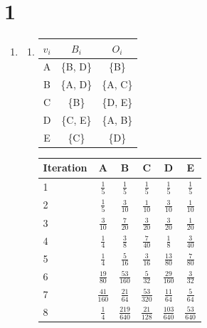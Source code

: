 \documentclass[ngerman]{scrartcl}
\begin{document}
\section*{1}
  \begin{enumerate}[label=\alph*)]
    \item
    \begin{enumerate}[label=\Roman*)]
      \item
      \begin{tabular}{|*{3}{c|}}
        \hline
        $v_i$ & $B_i$ & $O_i$ \\
        \hline
        A & \{B, D\} & \{B\}    \\
        \hline
        B & \{A, D\} & \{A, C\} \\
        \hline
        C & \{B\}    & \{D, E\} \\
        \hline
        D & \{C, E\} & \{A, B\} \\
        \hline
        E & \{C\}    & \{D\}    \\
        \hline
      \end{tabular}
      \begin{doublespacing}
        \begin{tabular}{|l|*{5}{c|}}
          \hline
          Iteration & A & B & C & D & E \\
          \hline
          1 & $\frac{1}{5}$ & $\frac{1}{5}$ & $\frac{1}{5}$ & $\frac{1}{5}$ & $\frac{1}{5}$ \\
          \hline
          2 & $\frac{1}{5}$ & $\frac{3}{10}$ & $\frac{1}{10}$ & $\frac{3}{10}$ & $\frac{1}{10}$ \\
          \hline
          3 & $\frac{3}{10}$ & $\frac{7}{20}$ & $\frac{3}{20}$ & $\frac{3}{20}$ & $\frac{1}{20}$ \\
          \hline
          4 & $\frac{1}{4}$ & $\frac{3}{8}$ & $\frac{7}{40}$ & $\frac{1}{8}$ & $\frac{3}{40}$ \\
          \hline
          5 & $\frac{1}{4}$ & $\frac{5}{16}$ & $\frac{3}{16}$ & $\frac{13}{80}$ & $\frac{7}{80}$ \\
          \hline
          6 & $\frac{19}{80}$ & $\frac{53}{160}$ & $\frac{5}{32}$ & $\frac{29}{160}$ & $\frac{3}{32}$ \\
          \hline
          7 & $\frac{41}{160}$ & $\frac{21}{64}$ & $\frac{53}{320}$ & $\frac{11}{64}$ & $\frac{5}{64}$ \\
          \hline
          8 & $\frac{1}{4}$ & $\frac{219}{640}$ & $\frac{21}{128}$ & $\frac{103}{640}$ & $\frac{53}{640}$ \\
          \hline
        \end{tabular}
      \end{doublespacing}


\end{enumerate}
\end{enumerate}
\end{document}
